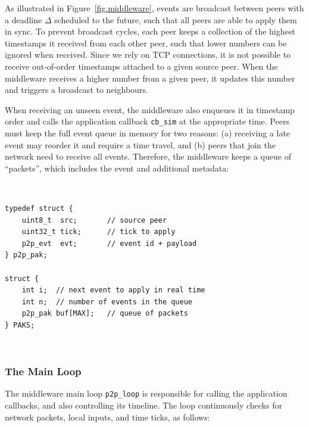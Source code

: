 \documentclass[10pt,journal,compsoc]{IEEEtran}
\newcommand{\code}[1]  {\texttt{\small{#1}}}
\begin{document}
As illustrated in Figure~\ref{fig.middleware}, events are broadcast between
peers with a deadline $\Delta$ scheduled to the future, such that all peers are
able to apply them in sync.
%
To prevent broadcast cycles, each peer keeps a collection of the highest
timestamps it received from each other peer, such that lower numbers can be
ignored when received.
Since we rely on TCP connections, it is not possible to receive out-of-order
timestamps attached to a given source peer.
When the middleware receives a higher number from a given peer, it updates this
number and triggers a broadcast to neighbours.
%

When receiving an unseen event, the middleware also enqueues it in timestamp
order and calls the application callback \code{cb\_sim} at the appropriate
time.
Peers must keep the full event queue in memory for two reasons:
    (a) receiving a late event may reorder it and require a time travel, and
    (b) peers that join the network need to receive all events.
%
Therefore, the middleware keeps a queue of ``packets'', which includes the
event and additional metadata:

{\footnotesize
~
\begin{verbatim}
typedef struct {
    uint8_t  src;       // source peer
    uint32_t tick;      // tick to apply
    p2p_evt  evt;       // event id + payload
} p2p_pak;

struct {
    int i;  // next event to apply in real time
    int n;  // number of events in the queue
    p2p_pak buf[MAX];   // queue of packets
} PAKS;
\end{verbatim}
~
}

\subsubsection{The Main Loop}
\label{sec.tml.middleware.loop}

The middleware main loop \code{p2p\_loop} is responsible for calling the
application callbacks, and also controlling its timeline.
The loop continuously checks for network packets, local inputs, and time ticks,
as follows:
\end{document}
